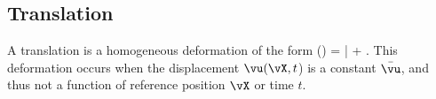 %
%

\clearpage
\subsection{Translation}
\label{section:offset}
A translation is a homogeneous deformation of the form
\be
 \vvarphi(\vX) = \bar{\vu} + \vX.
\ee
This deformation occurs when the displacement 
$\vu(\vX, t$) is a constant 
$\bar{\vu}$, 
and thus not a function of 
reference position $\vX$ or time $t$.

